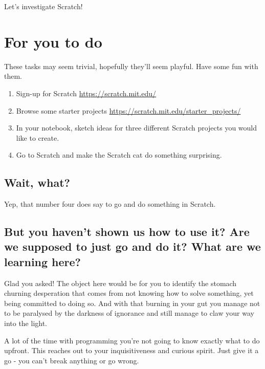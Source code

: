 \documentclass[]{book}
\providecommand{\tightlist}{%
  \setlength{\itemsep}{0pt}\setlength{\parskip}{0pt}}
\begin{document}
Let's investigate Scratch!

\hypertarget{for-you-to-do}{%
\section{For you to do}\label{for-you-to-do}}

These tasks may seem trivial, hopefully they'll seem playful. Have some
fun with them.

\begin{enumerate}
\def\labelenumi{\arabic{enumi}.}
\tightlist
\item
  Sign-up for Scratch \url{https://scratch.mit.edu/}
\item
  Browse some starter projects
  \url{https://scratch.mit.edu/starter_projects/}
\item
  In your notebook, sketch ideas for three different Scratch projects
  you would like to create.
\item
  Go to Scratch and make the Scratch cat do something surprising.
\end{enumerate}

\hypertarget{wait-what}{%
\subsection{Wait, what?}\label{wait-what}}

Yep, that number four does say to go and do something in Scratch.

\hypertarget{but-you-havent-shown-us-how-to-use-it-are-we-supposed-to-just-go-and-do-it-what-are-we-learning-here}{%
\subsection{But you haven't shown us how to use it? Are we supposed to
just go and do it? What are we learning
here?}\label{but-you-havent-shown-us-how-to-use-it-are-we-supposed-to-just-go-and-do-it-what-are-we-learning-here}}

Glad you asked! The object here would be for you to identify the stomach
churning desperation that comes from not knowing how to solve something,
yet being committed to doing so. And with that burning in your gut you
manage not to be paralysed by the darkness of ignorance and still manage
to claw your way into the light.

A lot of the time with programming you're not going to know exactly what
to do upfront. This reaches out to your inquisitiveness and curious
spirit. Just give it a go - you can't break anything or go wrong.
\end{document}
